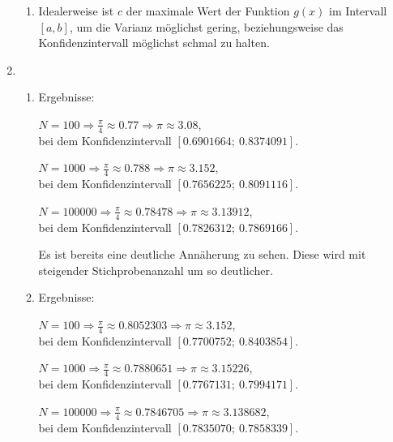 \documentclass[a4paper]{scrartcl}
\def \blattnr {11}
\begin{document}
\begin{enumerate}[label=\bfseries \blattnr.\arabic*]
\begin{enumerate}
     \item %
     Idealerweise ist $c$ der maximale Wert der Funktion $g(x)$ im Intervall 
     $[a,b]$, um die Varianz möglichst gering, beziehungsweise das 
     Konfidenzintervall möglichst schmal zu halten.

    \end{enumerate}
  \item %
    \begin{enumerate}
     \item %
         

         Ergebnisse:

         $N = 100 \Rightarrow \frac\pi4 \approx \num{0.77} \Rightarrow \pi \approx \num{3.08}$, \\
         bei dem Konfidenzintervall $[\num{0.6901664} ;\ \num{0.8374091}]$.

         $N = 1000 \Rightarrow \frac\pi4 \approx \num{0.788} \Rightarrow \pi \approx \num{3.152}$, \\
         bei dem Konfidenzintervall $[\num{0.7656225} ;\ \num{0.8091116}]$.

         $N = \num{100000} \Rightarrow \frac\pi4 \approx \num{0.78478} \Rightarrow \pi \approx \num{3.13912}$, \\
         bei dem Konfidenzintervall $[\num{0.7826312} ;\ \num{0.7869166}]$.

         Es ist bereits eine deutliche Annäherung zu sehen. Diese wird mit steigender 
         Stichprobenanzahl um so deutlicher.
     \pagebreak
     \item %
     

         Ergebnisse:

         $N = 100 \Rightarrow \frac\pi4 \approx \num{0.8052303} \Rightarrow \pi \approx \num{3.152}$, \\
         bei dem Konfidenzintervall $[\num{0.7700752} ;\ \num{0.8403854}]$.

         $N = 1000 \Rightarrow \frac\pi4 \approx \num{0.7880651} \Rightarrow \pi \approx \num{3.15226}$, \\
         bei dem Konfidenzintervall $[\num{0.7767131} ;\ \num{0.7994171}]$.

         $N = \num{100000} \Rightarrow \frac\pi4 \approx \num{0.7846705} \Rightarrow \pi \approx \num{3.138682}$, \\
         bei dem Konfidenzintervall $[\num{0.7835070} ;\ \num{0.7858339}]$.


\end{enumerate}
\end{enumerate}
\end{document}
